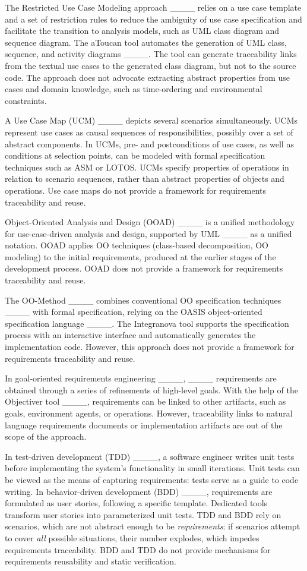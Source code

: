 The Restricted Use Case Modeling approach ____ relies on a use case template and a set of restriction rules to reduce the ambiguity of use case specification and facilitate the transition to analysis models, such as UML class diagram and sequence diagram. The aToucan tool automates the generation of UML class, sequence, and activity diagrams ____. The tool can generate traceability links from the textual use cases to the generated class diagram, but not to the source code. The approach does not advocate extracting abstract properties from use cases and domain knowledge, such as time-ordering and environmental constraints. 

A Use Case Map (UCM) ____ depicts several scenarios simultaneously.
UCMs represent use cases as causal sequences of responsibilities, possibly over a set of abstract components. 
In UCMs, pre- and postconditions of use cases, as well as conditions at selection points, can be modeled with formal specification techniques such as ASM or LOTOS.  
UCMs specify properties of operations in relation to scenario sequences, rather than abstract properties of objects and operations. Use case maps do not provide a framework for requirements traceability and reuse.

Object-Oriented Analysis and Design (OOAD) ____ is a unified methodology for use-case-driven analysis and design, supported by UML ____ as a unified notation. OOAD applies OO techniques (class-based decomposition, OO modeling) to the initial requirements, produced at the earlier stages of the development process. OOAD does not provide a framework for requirements traceability and reuse.

The OO-Method ____ combines conventional OO specification techniques ____ with formal specification, relying on the OASIS object-oriented specification language ____. 
The Integranova tool supports the specification process with an interactive interface and automatically generates the implementation code. However, this approach does not provide a framework for requirements traceability and reuse.

In goal-oriented requirements engineering  ____, ____ requirements are obtained through a series of refinements of high-level goals. With the help of the Objectiver tool ____,
requirements can be linked to other artifacts, such as goals, environment agents, or operations. However, traceability links to natural language requirements documents or implementation artifacts are out of the scope of the approach.

In test-driven development (TDD) ____, a software engineer writes unit tests before implementing the system’s functionality in small iterations. Unit tests can be viewed as the means of capturing requirements: tests serve as a guide to code writing. In behavior-driven development (BDD) ____, requirements are formulated as user stories, following a specific template. Dedicated tools transform user stories into parameterized unit tests. TDD and BDD rely on scenarios, which are not abstract enough to be \textit{requirements}: if scenarios attempt to cover \textit{all} possible situations, their number explodes, which impedes requirements traceability. BDD and TDD do not provide mechanisms for requirements reusability and static verification.
   
